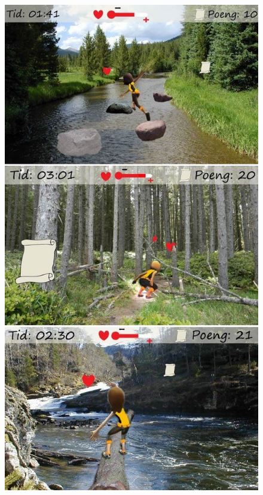 \begin{figure} [H]
\centering
\includegraphics[scale=0.45]{hindring1.jpg}
\caption[Nature trail - obstacles, part one]{}
\label{fig:hindring1}
\end{figure}

